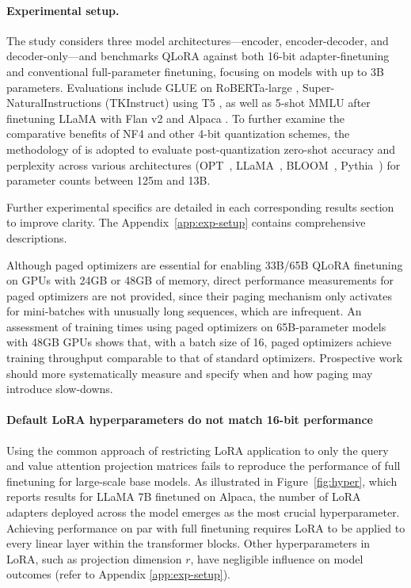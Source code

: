 \paragraph{Experimental setup.} The study considers three model architectures—encoder, encoder-decoder, and decoder-only—and benchmarks QLoRA against both 16-bit adapter-finetuning and conventional full-parameter finetuning, focusing on models with up to 3B parameters. Evaluations include GLUE \citep{wang2018glue} on RoBERTa-large \citep{liu2019roberta}, Super-NaturalInstructions (TKInstruct) \citep{wang2022super} using T5 \citep{t5}, as well as 5-shot MMLU \citep{hendrycksmeasuring} after finetuning LLaMA with Flan v2 \citep{longpre2023flan} and Alpaca \citep{alpaca}. To further examine the comparative benefits of NF4 and other 4-bit quantization schemes, the methodology of \citet{dettmers2022case} is adopted to evaluate post-quantization zero-shot accuracy and perplexity across various architectures (OPT~\citep{zhang2022opt}, LLaMA~\citep{touvron2023llama}, BLOOM~\citep{scao2022bloom}, Pythia~\citep{biderman2023pythia}) for parameter counts between 125m and 13B.

Further experimental specifics are detailed in each corresponding results section to improve clarity. The Appendix~\ref{app:exp-setup} contains comprehensive descriptions.

Although paged optimizers are essential for enabling 33B/65B \textsc{QLoRA} finetuning on GPUs with 24GB or 48GB of memory, direct performance measurements for paged optimizers are not provided, since their paging mechanism only activates for mini-batches with unusually long sequences, which are infrequent. An assessment of training times using paged optimizers on 65B-parameter models with 48GB GPUs shows that, with a batch size of 16, paged optimizers achieve training throughput comparable to that of standard optimizers. Prospective work should more systematically measure and specify when and how paging may introduce slow-downs.

\paragraph{Default LoRA hyperparameters do not match 16-bit performance} 

Using the common approach of restricting LoRA application to only the query and value attention projection matrices \citep{hu2021lora} fails to reproduce the performance of full finetuning for large-scale base models. As illustrated in Figure~\ref{fig:hyper}, which reports results for LLaMA 7B finetuned on Alpaca, the number of LoRA adapters deployed across the model emerges as the most crucial hyperparameter. Achieving performance on par with full finetuning requires LoRA to be applied to every linear layer within the transformer blocks. Other hyperparameters in LoRA, such as projection dimension $r$, have negligible influence on model outcomes (refer to Appendix \ref{app:exp-setup}).

